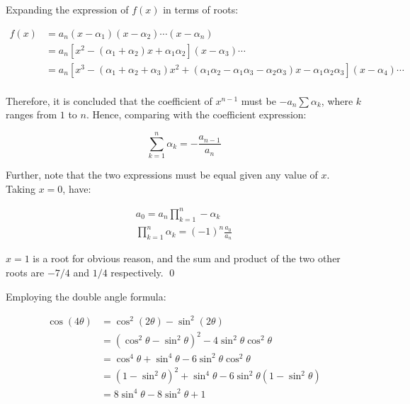 \documentclass[12pt]{article}
\begin{document}



Expanding the expression of $f(x)$ in terms of roots:

\begin{equation}
    \begin{split}
        f(x) &= a_{n} (x - \alpha_{1}) (x - \alpha_{2}) \cdots (x - \alpha_{n}) \\
        &= a_{n} [x^{2} - (\alpha_{1} + \alpha_{2})x + \alpha_{1} \alpha_{2}] (x - \alpha_{3}) \cdots \\
        &= a_{n} [x^{3} - (\alpha_{1} + \alpha_{2} + \alpha_{3})x^{2} + (\alpha_{1} \alpha_{2} - \alpha_{1} \alpha_{3} - \alpha_{2} \alpha_{3})x - \alpha_{1} \alpha_{2} \alpha_{3}] (x - \alpha_{4}) \cdots \\
    \end{split}
\end{equation}

Therefore, it is concluded that the coefficient of $x^{n-1}$ must be $-a_{n} \sum \alpha_{k}$, where $k$ ranges from $1$ to $n$. Hence, comparing with the coefficient expression:

\begin{equation}
    \sum_{k=1}^{n} \alpha_{k} = -\frac{a_{n-1}}{a_{n}}
\end{equation}

Further, note that the two expressions must be equal given any value of $x$. Taking $x=0$, have:

\begin{equation}
    \begin{split}
        a_{0} = a_{n} \prod_{k=1}^{n} -\alpha_{k} \\
        \prod_{k=1}^{n} \alpha_{k} = (-1)^{n} \frac{a_{0}}{a_{n}}
    \end{split}
\end{equation}

$x = 1$ is a root for obvious reason, and the sum and product of the two other roots are $\boxed{-7/4}$ and $\boxed{1/4}$ respectively.
\qed


Employing the double angle formula:

\begin{equation}
    \begin{split}
        \cos{(4\theta)} &= \cos^{2}{(2\theta)} - \sin^{2}{(2\theta)} \\
        &= (\cos^{2}{\theta} - \sin^{2}{\theta})^{2} - 4 \sin^{2}{\theta} \cos^{2}{\theta} \\
        &= \cos^{4}{\theta} + \sin^{4}{\theta} - 6 \sin^{2}{\theta} \cos^{2}{\theta} \\
        &= (1 - \sin^{2}{\theta})^{2} + \sin^{4}{\theta} - 6 \sin^{2}{\theta} (1 - \sin^{2}{\theta}) \\
        &= 8 \sin^{4}{\theta} - 8 \sin^{2}{\theta} + 1
    \end{split}
\end{equation}
\end{document}
